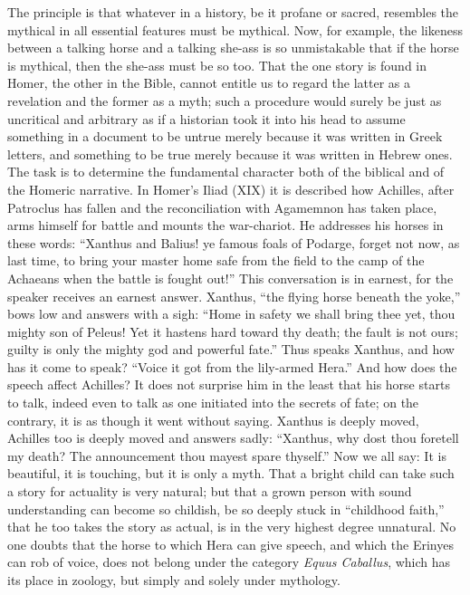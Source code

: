 \documentclass[12pt]{book}
\newcommand{\opage}[1]{\marginnote{\footnotesize\textit{[#1]}}}
\begin{document}
The principle is that whatever in a history, be it profane or sacred,
resembles the mythical in all essential features must be mythical. Now,
for example, the likeness between a talking horse and a talking she-ass
is so unmistakable that if the horse is mythical, then the she-ass must
be so too. That the one story is found in Homer, the other in the
Bible, cannot entitle us to regard the latter as a revelation and the
former as a myth; such a procedure would surely be
\opage{156}\setcounter{footnote}{0}%
just as uncritical and arbitrary as if a historian took it into his head
to assume something in a document to be untrue merely because it was
written in Greek letters, and something to be true merely because it was
written in Hebrew ones. The task is to determine the fundamental
character both of the biblical and of the Homeric narrative. In Homer's
Iliad (XIX) it is described how Achilles, after Patroclus has fallen and
the reconciliation with Agamemnon has taken place, arms himself for
battle and mounts the war-chariot. He addresses his horses in these
words: ``Xanthus and Balius! ye famous foals of Podarge, forget not now,
as last time, to bring your master home safe from the field to the camp
of the Achaeans when the battle is fought out!'' This conversation is in
earnest, for the speaker receives an earnest answer. Xanthus, ``the
flying horse beneath the yoke,'' bows low and answers with a sigh:
``Home in safety we shall bring thee yet, thou mighty son of Peleus! Yet
it hastens hard toward thy death; the fault is not ours; guilty is only
the mighty god and powerful fate.'' Thus speaks Xanthus, and how has it
come to speak? ``Voice it got from the lily-armed Hera.'' And how does
the speech affect Achilles? It does not surprise him in the least that
his horse starts to talk, indeed even to talk as one initiated into the
secrets of fate; on the contrary, it is as though it went without
saying. Xanthus is deeply moved, Achilles too is deeply moved and
answers sadly: ``Xanthus, why dost thou foretell my death? The
announcement thou mayest spare thyself.'' Now we all say: It is
beautiful, it is touching, but it is only a myth. That a bright child
can take such a story for actuality is very natural; but that a grown
person with sound understanding can become so childish, be so deeply
stuck in ``childhood faith,'' that he too takes the story as actual, is
in the very highest
\opage{157}\setcounter{footnote}{0}%
degree unnatural. No one doubts that the horse to which Hera can give
speech, and which the Erinyes can rob of voice, does not belong under
the category \textit{Equus Caballus}, which has its place in zoology,
but simply and solely under mythology.
\end{document}
